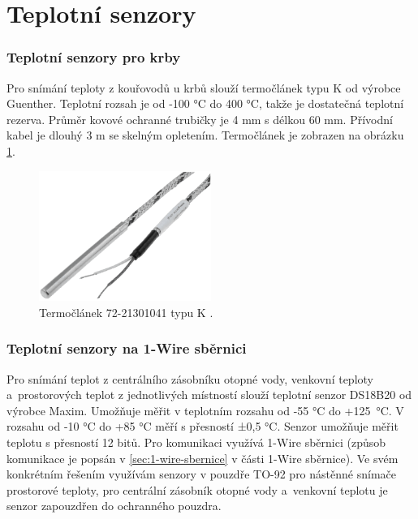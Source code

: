 \section{Teplotní senzory}
\subsubsection{Teplotní senzory pro krby}
\label{sec:teplotni-senzory-pro-krby}
Pro snímání teploty z kouřovodů u krbů slouží termočlánek typu K od výrobce Guenther. Teplotní rozsah je od -100 °C do 400 °C, takže je dostatečná teplotní rezerva. Průměr kovové ochranné trubičky je 4 mm s délkou 60 mm. Přívodní kabel je dlouhý 3 m se skelným opletením. Termočlánek je zobrazen na obrázku \ref{fig:termoclanek-72-21301041-k}.

\begin{figure}[H]
    \centering
    \includegraphics[width=0.5\textwidth]{images/termoclanek-72-21301041-k.png}
    \caption[Termočlánek 72-21301041 typu K.]{Termočlánek 72-21301041 typu K \cite{termoclanek-k}.}
    \label{fig:termoclanek-72-21301041-k}
\end{figure}

\subsubsection{Teplotní senzory na 1-Wire sběrnici}
Pro snímání teplot z centrálního zásobníku otopné vody, venkovní teploty a~prostorových teplot z jednotlivých místností slouží teplotní senzor DS18B20 od výrobce Maxim. Umožňuje měřit
v teplotním rozsahu od -55 °C do +125~°C. V rozsahu od -10 °C do +85 °C měří s přesností ±0,5 °C. Senzor umožňuje měřit teplotu s přesností 12 bitů. Pro komunikaci využívá 1-Wire sběrnici (způsob komunikace je popsán v \ref{sec:1-wire-sbernice} v části 1-Wire sběrnice). Ve svém konkrétním řešením využívám senzory v pouzdře TO-92 pro nástěnné snímače prostorové teploty, pro centrální zásobník otopné vody a~venkovní teplotu je senzor zapouzdřen do ochranného pouzdra.


